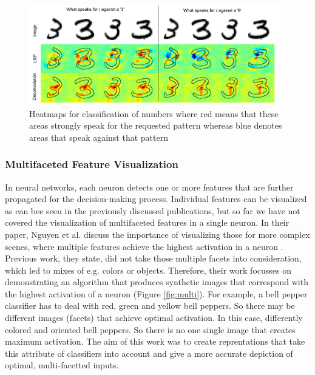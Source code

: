 \documentclass{acmsiggraph}               %
\begin{document}
\begin{figure}
\center
\includegraphics[width=\textwidth]{heatmap_samek_et_al}
\caption{Heatmaps for classification of numbers where red means that these areas strongly speak for the requested pattern whereas blue denotes areas that speak against that pattern \protect\cite{Samek2017}}
\label{fig:heatmap_numbers}
\end{figure}

\subsubsection{Multifaceted Feature Visualization}
In neural networks, each neuron detects one or more features that are further propagated for the decision-making process. 
Individual features can be visualized as can bee seen in the previously discussed publications, but so far we have not covered the visualization of multifaceted features in a single neuron. 
In their paper, Nguyen et al. discuss the importance of visualizing those for more complex scenes, where multiple features achieve the highest activation in a neuron \cite{Nguyen2016}. 
Previous work, they state, did not take those multiple facets into consideration, which led to mixes of e.g. colors or objects. 
Therefore, their work focusses on demonstrating an algorithm that produces synthetic images that correspond with the highest activation of a neuron (Figure \ref{fig:multi}). 
For example, a bell pepper classifier has to deal with red, green and yellow bell peppers. 
So there may be different images (facets) that achieve optimal activation. 
In this case, differently colored and oriented bell peppers. 
So there is no one single image that creates maximum activation. 
The aim of this work was to create reprentations that take this attribute of classifiers into account and give a more accurate depiction of optimal, multi-facetted inputs.
\end{document}
